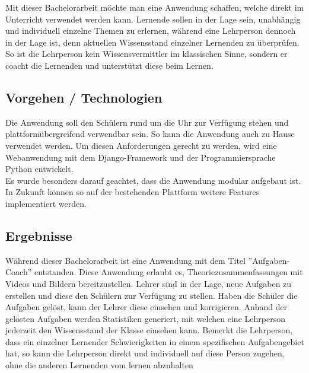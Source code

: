 Mit dieser Bachelorarbeit möchte man eine Anwendung schaffen, welche direkt im Unterricht verwendet werden kann. Lernende sollen in der Lage sein, unabhängig und individuell einzelne Themen zu erlernen, während eine Lehrperson dennoch in der Lage ist, denn aktuellen Wissensstand einzelner Lernenden zu überprüfen. So ist die Lehrperson kein Wissensvermittler im klassischen Sinne, sondern er coacht die Lernenden und unterstützt diese beim Lernen.



\subsection{Vorgehen / Technologien}
Die Anwendung soll den Schülern rund um die Uhr zur Verfügung stehen und plattformübergreifend verwendbar sein. So kann die Anwendung auch zu Hause verwendet werden. Um diesen Anforderungen gerecht zu werden, wird eine Webanwendung mit dem Django-Framework und der Programmiersprache Python entwickelt. \\
Es wurde besonders darauf geachtet, dass die Anwendung modular aufgebaut ist. In Zukunft können so auf der bestehenden Plattform weitere Features implementiert werden.

\subsection{Ergebnisse}
Während dieser Bachelorarbeit ist eine Anwendung mit dem Titel ''Aufgaben-Coach'' entstanden. Diese Anwendung erlaubt es, Theoriezusammenfassungen mit Videos und Bildern bereitzustellen. Lehrer sind in der Lage, neue Aufgaben zu erstellen und diese den Schülern zur Verfügung zu stellen. Haben die Schüler die Aufgaben gelöst, kann der Lehrer diese einsehen und korrigieren. Anhand der gelösten Aufgaben werden Statistiken generiert, mit welchen eine Lehrperson jederzeit den Wissensstand der Klasse einsehen kann. Bemerkt die Lehrperson, dass ein einzelner Lernender Schwierigkeiten in einem spezifischen Aufgabengebiet hat, so kann die Lehrperson direkt und individuell auf diese Person zugehen, ohne die anderen Lernenden vom lernen abzuhalten

